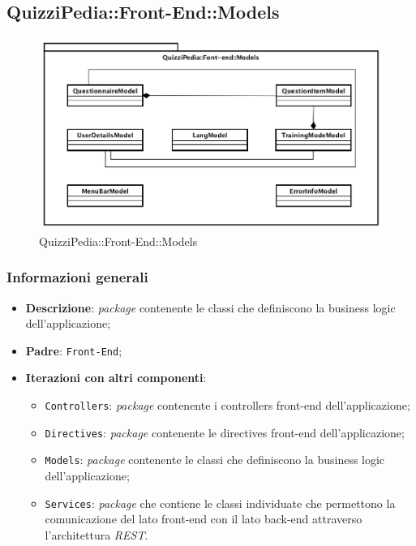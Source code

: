 \newpage

\subsection{QuizziPedia::Front-End::Models}

	\label{QuizziPedia::Front-End::Models}
	
	\begin{figure}[ht]
		\centering
		\includegraphics[scale=0.5,keepaspectratio]{UML/Package/QuizziPedia_Front-End_Models.png}
		\caption{QuizziPedia::Front-End::Models}
	\end{figure} \FloatBarrier

	\subsubsection{Informazioni generali}
		\begin{itemize}
			\item \textbf{Descrizione}: \textit{package} contenente le classi che definiscono la business logic dell'applicazione;
			\item \textbf{Padre}: \texttt{Front-End};
			\item \textbf{Iterazioni con altri componenti}: 
				\begin{itemize}				
					\item \texttt{Controllers}: \textit{package} contenente i controllers front-end dell'applicazione;
					\item \texttt{Directives}: \textit{package} contenente le directives front-end dell'applicazione;
					\item \texttt{Models}: \textit{package} contenente le classi che definiscono la business logic dell'applicazione;
					\item \texttt{Services}: \textit{package} che contiene le classi individuate che permettono la comunicazione del lato front-end con il lato back-end attraverso l'architettura \textit{REST}.
				\end{itemize}

		\end{itemize}
	
